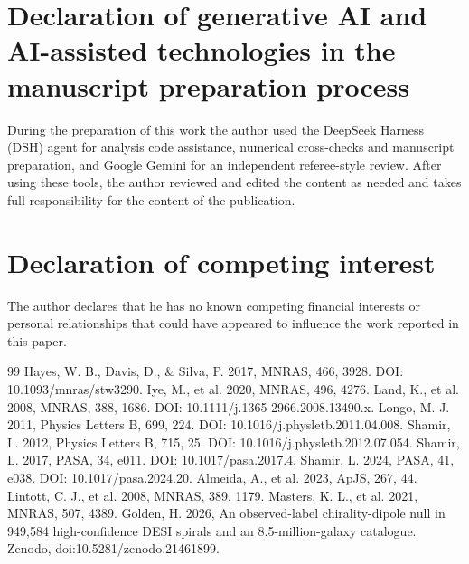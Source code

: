 \documentclass[preprint,12pt,authoryear]{elsarticle}
\begin{document}
\section*{Declaration of generative AI and AI-assisted technologies in the manuscript preparation process}
During the preparation of this work the author used the DeepSeek Harness (DSH) agent for analysis
code assistance, numerical cross-checks and manuscript preparation, and Google Gemini for an
independent referee-style review. After using these tools, the author reviewed and edited the
content as needed and takes full responsibility for the content of the publication.

\section*{Declaration of competing interest}
The author declares that he has no known competing financial interests or personal relationships
that could have appeared to influence the work reported in this paper.

\clearpage
\begin{thebibliography}{99}
 Hayes, W. B., Davis, D., \& Silva, P. 2017, MNRAS, 466, 3928. DOI: 10.1093/mnras/stw3290.
 Iye, M., et al. 2020, MNRAS, 496, 4276.
 Land, K., et al. 2008, MNRAS, 388, 1686. DOI: 10.1111/j.1365-2966.2008.13490.x.
 Longo, M. J. 2011, Physics Letters B, 699, 224. DOI: 10.1016/j.physletb.2011.04.008.
 Shamir, L. 2012, Physics Letters B, 715, 25. DOI: 10.1016/j.physletb.2012.07.054.
 Shamir, L. 2017, PASA, 34, e011. DOI: 10.1017/pasa.2017.4.
 Shamir, L. 2024, PASA, 41, e038. DOI: 10.1017/pasa.2024.20.
 Almeida, A., et al. 2023, ApJS, 267, 44.
 Lintott, C. J., et al. 2008, MNRAS, 389, 1179.
 Masters, K. L., et al. 2021, MNRAS, 507, 4389.
 Golden, H. 2026, An observed-label chirality-dipole null in 949,584 high-confidence DESI spirals and an 8.5-million-galaxy catalogue. Zenodo, doi:10.5281/zenodo.21461899.
\end{thebibliography}
\end{document}
